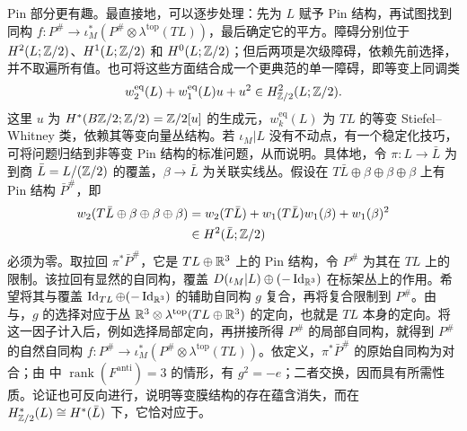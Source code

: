 Pin 部分更有趣。最直接地，可以逐步处理：先为 $L$ 赋予 Pin 结构，再试图找到同构 $f:P^\#\to\iota_M^*(P^\#\otimes\lambda^{\mathrm{top}}(TL))$，最后确定它的平方。障碍分别位于 $H^2(L;\mathbb Z/2)$、$H^1(L;\mathbb Z/2)$ 和 $H^0(L;\mathbb Z/2)$；但后两项是次级障碍，依赖先前选择，并不取遍所有值。也可将这些方面结合成一个更典范的单一障碍，即等变上同调类
\begin{equation}\label{eq:14.3}
w_2^{\mathrm{eq}}(L)+w_1^{\mathrm{eq}}(L)u+u^2\in H_{\mathbb Z/2}^2(L;\mathbb Z/2).
\end{equation}
这里 $u$ 为 $H^*(B\mathbb Z/2;\mathbb Z/2)=\mathbb Z/2[u]$ 的生成元，$w_k^{\mathrm{eq}}(L)$ 为 $TL$ 的等变 Stiefel–Whitney 类，依赖其等变向量丛结构。若 $\iota_M|L$ 没有不动点，有一个稳定化技巧，可将问题归结到非等变 Pin 结构的标准问题，从而说明。具体地，令 $\pi:L\to\bar L$ 为到商 $\bar L=L/(\mathbb Z/2)$ 的覆盖，$\beta\to\bar L$ 为关联实线丛。假设在 $T\bar L\oplus\beta\oplus\beta\oplus\beta$ 上有 Pin 结构 $\bar P^\#$，即
\begin{equation}\label{eq:14.4}
\begin{aligned}
w_2(T\bar L\oplus\beta\oplus\beta\oplus\beta)
&=w_2(T\bar L)+w_1(T\bar L)w_1(\beta)+w_1(\beta)^2\\
&\in H^2(\bar L;\mathbb Z/2)
\end{aligned}
\end{equation}
必须为零。取拉回 $\pi^*\bar P^\#$，它是 $TL\oplus\mathbb R^3$ 上的 Pin 结构，令 $P^\#$ 为其在 $TL$ 上的限制。该拉回有显然的自同构，覆盖 $D(\iota_M|L)\oplus(-\operatorname{Id}_{\mathbb R^3})$ 在标架丛上的作用。希望将其与覆盖 $\operatorname{Id}_{TL}\oplus(-\operatorname{Id}_{\mathbb R^3})$ 的辅助自同构 $g$ 复合，再将复合限制到 $P^\#$。由与，$g$ 的选择对应于丛 $\mathbb R^3\otimes\lambda^{\mathrm{top}}(TL\oplus\mathbb R^3)$ 的定向，也就是 $TL$ 本身的定向。将这一因子计入后，例如选择局部定向，再拼接所得 $P^\#$ 的局部自同构，就得到 $P^\#$ 的自然自同构 $f:P^\#\to\iota_M^*(P^\#\otimes\lambda^{\mathrm{top}}(TL))$。依定义，$\pi^*\bar P^\#$ 的原始自同构为对合；由
中 $\operatorname{rank}(F^{\mathrm{anti}})=3$ 的情形，有 $g^2=-e$；二者交换，因而具有所需性质。论证也可反向进行，说明等变膜结构的存在蕴含消失，而在 $H_{\mathbb Z/2}^*(L)\cong H^*(\bar L)$ 下，它恰对应于。

